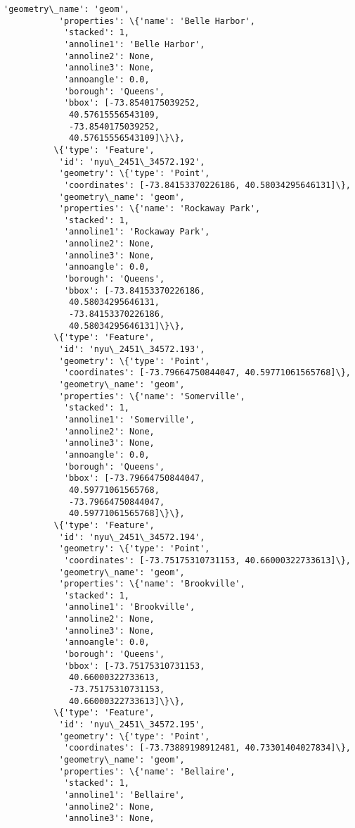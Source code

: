 \documentclass[11pt]{article}
\begin{document}
\begin{Verbatim}[commandchars=\\\{\}]
           'geometry\_name': 'geom',
           'properties': \{'name': 'Belle Harbor',
            'stacked': 1,
            'annoline1': 'Belle Harbor',
            'annoline2': None,
            'annoline3': None,
            'annoangle': 0.0,
            'borough': 'Queens',
            'bbox': [-73.8540175039252,
             40.57615556543109,
             -73.8540175039252,
             40.57615556543109]\}\},
          \{'type': 'Feature',
           'id': 'nyu\_2451\_34572.192',
           'geometry': \{'type': 'Point',
            'coordinates': [-73.84153370226186, 40.58034295646131]\},
           'geometry\_name': 'geom',
           'properties': \{'name': 'Rockaway Park',
            'stacked': 1,
            'annoline1': 'Rockaway Park',
            'annoline2': None,
            'annoline3': None,
            'annoangle': 0.0,
            'borough': 'Queens',
            'bbox': [-73.84153370226186,
             40.58034295646131,
             -73.84153370226186,
             40.58034295646131]\}\},
          \{'type': 'Feature',
           'id': 'nyu\_2451\_34572.193',
           'geometry': \{'type': 'Point',
            'coordinates': [-73.79664750844047, 40.59771061565768]\},
           'geometry\_name': 'geom',
           'properties': \{'name': 'Somerville',
            'stacked': 1,
            'annoline1': 'Somerville',
            'annoline2': None,
            'annoline3': None,
            'annoangle': 0.0,
            'borough': 'Queens',
            'bbox': [-73.79664750844047,
             40.59771061565768,
             -73.79664750844047,
             40.59771061565768]\}\},
          \{'type': 'Feature',
           'id': 'nyu\_2451\_34572.194',
           'geometry': \{'type': 'Point',
            'coordinates': [-73.75175310731153, 40.66000322733613]\},
           'geometry\_name': 'geom',
           'properties': \{'name': 'Brookville',
            'stacked': 1,
            'annoline1': 'Brookville',
            'annoline2': None,
            'annoline3': None,
            'annoangle': 0.0,
            'borough': 'Queens',
            'bbox': [-73.75175310731153,
             40.66000322733613,
             -73.75175310731153,
             40.66000322733613]\}\},
          \{'type': 'Feature',
           'id': 'nyu\_2451\_34572.195',
           'geometry': \{'type': 'Point',
            'coordinates': [-73.73889198912481, 40.73301404027834]\},
           'geometry\_name': 'geom',
           'properties': \{'name': 'Bellaire',
            'stacked': 1,
            'annoline1': 'Bellaire',
            'annoline2': None,
            'annoline3': None,

\end{Verbatim}
\end{document}
